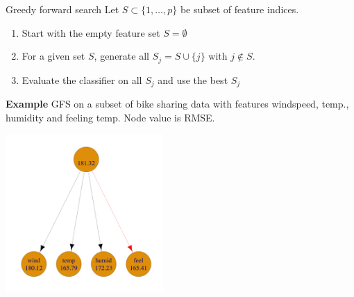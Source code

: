 \documentclass[11pt,compress,t,notes=noshow, xcolor=table]{beamer}
\begin{document}



\begin{frame}{Greedy forward search}
Let $S \subset \{1, \dots, p \}$ be subset of feature indices.
\vspace{-0.01cm}
    \begin{enumerate}
      \item Start with the empty feature set $S = \emptyset$
      \item For a given set $S$, generate all $S_j = S \cup \{j\}$ with $j \notin S$.
      \item Evaluate the classifier on all $S_j$ and use the best $S_j$
      \end{enumerate}
    \textbf{Example} GFS on a subset of bike sharing data with features windspeed, temp., humidity and feeling temp. Node value is RMSE.
    \begin{center}
    \includegraphics[width = 0.45\textwidth]{figure/fs-wrappers-powerset-tree-1.png}
    \end{center}

\end{frame}
\end{document}

